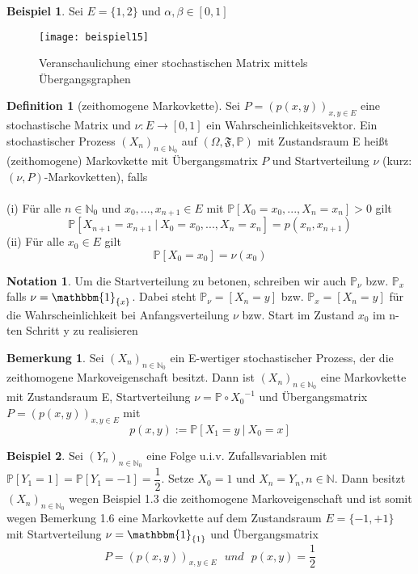\documentclass[a4paper,12pt]{scrartcl}
\theoremstyle{definition}
\newtheorem{noti}{Notation}[section]
\newtheorem{bem}{Bemerkung}[section]
\newtheorem{bsp}{Beispiel}[section]
\newtheorem{defi}{Definition}[section]
\begin{document}
\begin{bsp}
Sei $E = \lbrace 1,2 \rbrace$ und $\alpha, \beta \in [0,1]$
\begin{figure}[H]
\texttt{[image: beispiel15]}
\caption{Veranschaulichung einer stochastischen Matrix mittels Übergangsgraphen}
\end{figure}
\end{bsp}
\begin{defi}[zeithomogene Markovkette]
\label{zeithomogene Markovkette}
Sei  $P =(p(x,y))_{x,y \in E}$ eine stochastische Matrix und $\nu: E \to [0,1]$ ein Wahrscheinlichkeitsvektor. Ein stochastischer Prozess $(X_{n})_{n \in \mathbb{N}_{0}}$ auf $(\Omega, \mathfrak{F}, \mathbb{P})$ mit Zustandsraum E heißt (zeithomogene) Markovkette mit Übergangsmatrix $P$ und Startverteilung $\nu$ (kurz: $(\nu,P)$-Markovketten), falls
\\
\\
(i) Für alle $n \in \mathbb{N}_{0}$ und $x_{0},...,x_{n+1} \in E$ mit $\mathbb{P}[X_{0} = x_{0},...,X_{n} = x_{n}]>0$ gilt
\begin{equation*}
\mathbb{P}[X_{n+1} = x_{n+1} \: | \: X_{0} = x_{0},...,X_{n} = x_{n}] = p(x_{n},x_{n+1})
\end{equation*}
(ii) Für alle $x_{0} \in E$ gilt
\begin{equation*}
\mathbb{P}[X_{0} = x_{0}]  = \nu(x_{0})
\end{equation*}
\end{defi}
\begin{noti}
Um die Startverteilung zu betonen, schreiben wir auch $\mathbb{P}_{\nu}$ bzw. $\mathbb{P}_{x}$ falls $\nu = \mathbbm{1}_{ \lbrace x \rbrace}$.
Dabei steht $\mathbb{P}_{\nu} = [X_{n} = y]$ bzw. $\mathbb{P}_{x} = [X_{n} = y]$ für die Wahrscheinlichkeit bei Anfangsverteilung $\nu$ bzw. Start im Zustand $x_{0}$ im n-ten Schritt y zu realisieren
\end{noti}
\begin{bem}
Sei $(X_{n})_{n \in \mathbb{N}_{0}}$ ein E-wertiger stochastischer Prozess, der die zeithomogene Markoveigenschaft besitzt. Dann ist $(X_{n})_{n \in \mathbb{N}_{0}}$ eine Markovkette mit Zustandsraum E, Startverteilung $\nu = \mathbb{P} \circ {X_{0}}^{-1}$ und Übergangsmatrix $P =(p(x,y))_{x,y \in E}$ mit
\begin{equation*}
p(x,y) := \mathbb{P}[X_{1} = y \: | \: X_{0} = x]
\end{equation*}
\end{bem}
\begin{bsp}
Sei $(Y_{n})_{n \in \mathbb{N}_{0}}$ eine Folge u.i.v. Zufallsvariablen mit 
\\
$\mathbb{P}[Y_{1} = 1] = \mathbb{P}[Y_{1} = -1] =\dfrac{1}{2}$. Setze $X_{0} = 1$ und $X_{n} = Y_{n}, n \in \mathbb{N}$. Dann besitzt $(X_{n})_{n \in \mathbb{N}_{0}}$ wegen Beispiel 1.3 die zeithomogene Markoveigenschaft und ist somit wegen Bemerkung 1.6 eine Markovkette auf dem Zustandsraum $E = \lbrace -1,+1  \rbrace$ mit Startverteilung $\nu = \mathbbm{1}_{\lbrace 1 \rbrace}$ und Übergangsmatrix 
\begin{equation*}
P =(p(x,y))_{x,y \in E} \: \: \:  und \: \: \: p(x,y) = \dfrac{1}{2}
\end{equation*}
\end{bsp}
\end{document}
